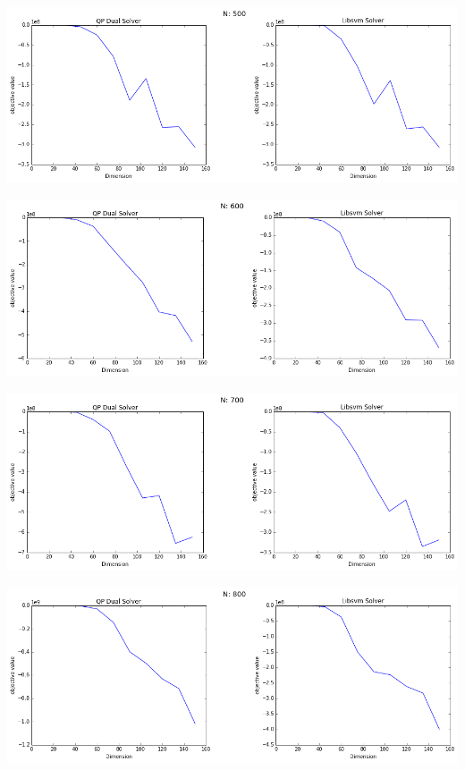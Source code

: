 \documentclass[12pt, a4paper]{article}
\begin{document}
			\begin{center}
				\includegraphics[width=18cm]{2par_obj_N500.png}
			\end{center}

			\begin{center}
				\includegraphics[width=18cm]{2par_obj_N600.png}
			\end{center}

			\begin{center}
				\includegraphics[width=18cm]{2par_obj_N700.png}
			\end{center}

			\begin{center}
				\includegraphics[width=18cm]{2par_obj_N800.png}
			\end{center}
\end{document}
